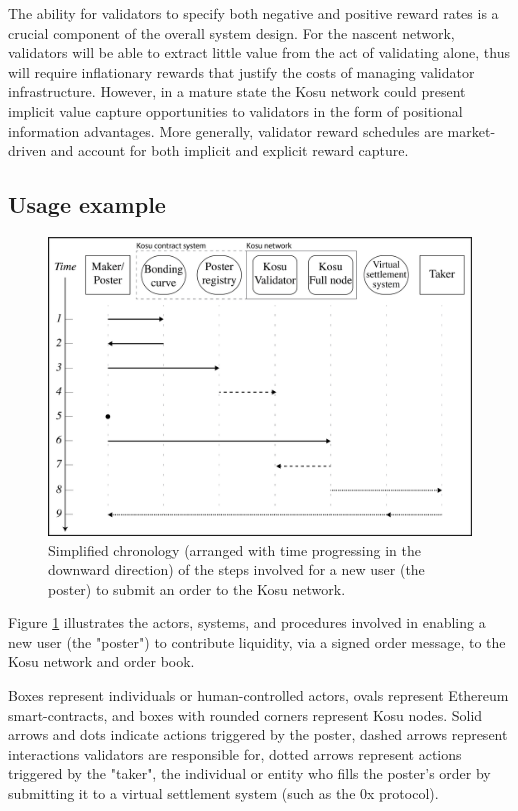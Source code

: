 \documentclass[10pt]{article}
\begin{document}
The ability for validators to specify both negative and positive reward rates is a crucial component of the overall system design. For the nascent network, validators will be able to extract little value from the act of validating alone, thus will require inflationary rewards that justify the costs of managing validator infrastructure. However, in a mature state the Kosu network could present implicit value capture opportunities to validators in the form of positional information advantages. More generally, validator reward schedules are market-driven and account for both implicit and explicit reward capture.

\subsection{Usage example}\label{overview-example}
\begin{figure}[H]
  \centering
  \includegraphics[width=\textwidth]{../figures/fig2.png}
  \caption{Simplified chronology (arranged with time progressing in the downward direction) of the steps involved for a new user (the poster) to submit an order to the Kosu network.}
  \label{fig:fig1}
\end{figure}
Figure \ref{fig:fig1} illustrates the actors, systems, and procedures involved in enabling a new user (the "poster") to contribute liquidity, via a signed order message, to the Kosu network and order book.
\medskip

Boxes represent individuals or human-controlled actors, ovals represent Ethereum smart-contracts, and boxes with rounded corners represent Kosu nodes. Solid arrows and dots indicate actions triggered by the poster, dashed arrows represent interactions validators are responsible for, dotted arrows represent actions triggered by the "taker", the individual or entity who fills the poster's order by submitting it to a virtual settlement system (such as the 0x protocol\cite{0x-wp}).
\medskip
\end{document}
